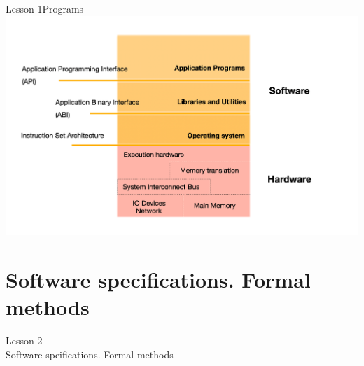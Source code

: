 \documentclass[aspectratio=1610]{beamer}
\begin{document}
\begin{frame}{Lesson 1}{Programs}
\includegraphics[scale=0.15]{Images/sfwhdw}
\end{frame}












\section{Software specifications. Formal methods}

\begin{frame}
\begin{center}
\Huge Lesson 2\\
Software speifications. Formal methods
\end{center}
\end{frame}
\end{document}
